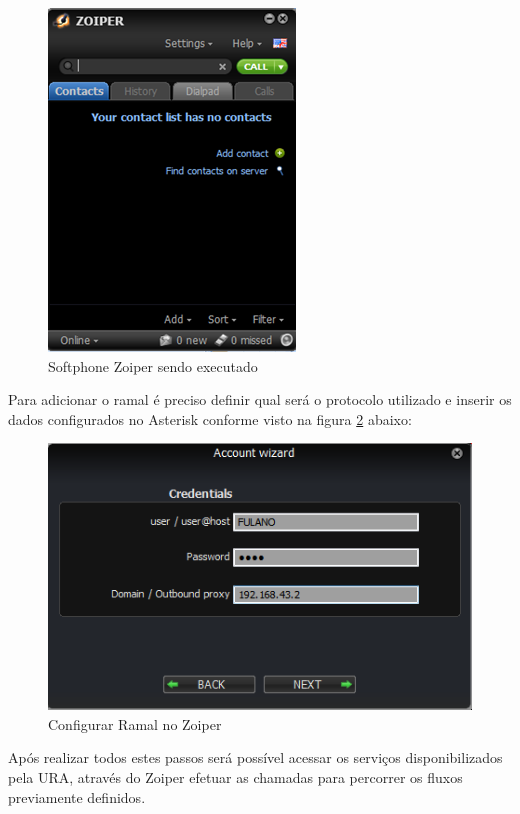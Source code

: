 \begin{figure}[H]
	\centering
	\caption{Softphone Zoiper sendo executado}	
	\label{figura:zoiper}
	\includegraphics{figuras/zoiper.png}
\end{figure}


Para adicionar o ramal é preciso definir qual será o protocolo utilizado e inserir os dados configurados no Asterisk conforme visto na figura \ref{figura:zoiperConfigRamal} abaixo:

\begin{figure}[H]
	\centering
	\caption{Configurar Ramal no Zoiper}
	\label{figura:zoiperConfigRamal}
	\includegraphics{figuras/configurar_ramal_zoiper.png}
\end{figure}

Após realizar todos estes passos será possível acessar os serviços disponibilizados pela URA, através do Zoiper efetuar as chamadas para percorrer os fluxos previamente definidos.